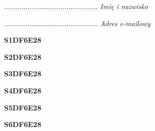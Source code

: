 \begin{turn}{90}\begin{minipage}{\linewidth} \vspace{20mm} ................................................  \textit{Imię i nazwisko}\end{minipage}\end{turn}

\begin{turn}{90}\begin{minipage}{\linewidth} \vspace{20mm} ................................................  \textit{Adres e-mailowy}\end{minipage}\end{turn}

\begin{turn}{90}\huge \begin{minipage}{\linewidth} \vspace{10mm}\textbf{S1DF6E28}\end{minipage}\end{turn}

\begin{turn}{90}\huge \begin{minipage}{\linewidth} \vspace{10mm}\textbf{S2DF6E28}\end{minipage}\end{turn}

\begin{turn}{90}\huge \begin{minipage}{\linewidth} \vspace{10mm}\textbf{S3DF6E28}\end{minipage}\end{turn}

\begin{turn}{90}\huge \begin{minipage}{\linewidth} \vspace{10mm}\textbf{S4DF6E28}\end{minipage}\end{turn}

\begin{turn}{90}\huge \begin{minipage}{\linewidth} \vspace{10mm}\textbf{S5DF6E28}\end{minipage}\end{turn}

\begin{turn}{90}\huge \begin{minipage}{\linewidth} \vspace{10mm}\textbf{S6DF6E28}\end{minipage}\end{turn}

